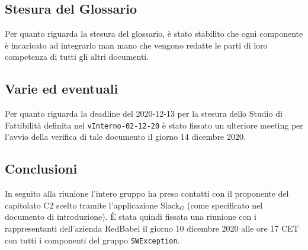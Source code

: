 	\subsection{Stesura del Glossario}
	Per quanto riguarda la stesura del glossario, è stato stabilito che ogni componente è incaricato ad integrarlo man mano che vengono redatte le parti di loro competenza di tutti gli altri documenti.
	
	\subsection{Varie ed eventuali}
	Per quanto riguarda la deadline del 2020-12-13 per la stesura dello Studio di Fattibilità definita nel \verb|vInterno-02-12-20| è stato fissato un ulteriore meeting per l'avvio della verifica di tale documento il giorno 14 dicembre 2020.
	
	\subsection{Conclusioni}
	In seguito alla riunione l'intero gruppo ha preso contatti con il proponente del capitolato C2 scelto tramite l'applicazione Slack$_G$ (come specificato nel documento di introduzione). È stata quindi fissata una riunione con i rappresentanti dell'azienda RedBabel il giorno 10 dicembre 2020 alle ore 17 CET con tutti i componenti del gruppo \verb|SWException|.
	